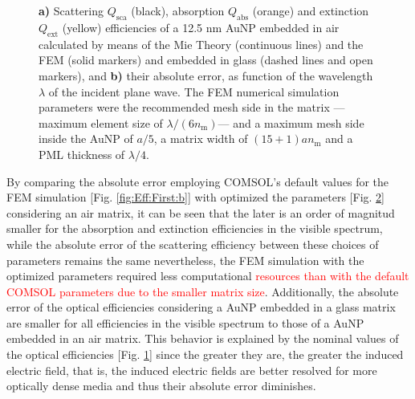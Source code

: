 \begin{figure}[h!]
 \def\svgwidth{.9\textwidth}
 \small
 \centering
    \hspace*{-.95\textwidth}
     \begin{subfigure}{\textwidth}\caption{}\label{fig:Eff:Conv:a}\end{subfigure}\\[11.5em]
    \hspace*{-.95\textwidth}
     \begin{subfigure}{\textwidth}\caption{}\label{fig:Eff:Conv:b}\end{subfigure}\\[-15em]
\caption[Scattering, Absorption and Extinction Efficiencies of a 12.5 nm AuNP$@$Air: Analytical and FEM solutions with optimized parameters for a FEM simulation]{\textbf{a)} Scattering $Q_\text{sca}$ (black), absorption $Q_\text{abs}$ (orange) and extinction $Q_\text{ext}$ (yellow) efficiencies of a 12.5 nm AuNP embedded in air calculated by means of the Mie Theory (continuous lines) and the FEM (solid markers) and embedded in glass (dashed lines and open markers), and \textbf{b)} their absolute error, as function of the wavelength $\lambda$ of the incident plane wave. The FEM numerical simulation parameters were the recommended mesh side in the matrix ---maximum element size of $\lambda/(6n_\text{m})$--- and a maximum mesh side inside the AuNP of $a/5$, a matrix width of $(15+1) a n_\text{m}$ and a PML thickness of $\lambda/4$.}
\label{fig:Eff:Conv}
\end{figure}

By comparing the absolute error employing COMSOL's default values for the FEM simulation [Fig. \ref{fig:Eff:First:b}] with optimized the parameters [Fig. \ref{fig:Eff:Conv:b}] considering an air matrix, it can be seen that the later is an order of magnitud smaller for the absorption and extinction efficiencies in the visible spectrum, while the absolute error of the scattering efficiency between these choices of parameters remains the same nevertheless, the FEM simulation with the optimized parameters required less computational \textcolor{red}{resources than with the default COMSOL parameters due to the smaller matrix size}. Additionally, the absolute error of the optical efficiencies considering a AuNP embedded in a glass matrix are smaller for all efficiencies in the visible spectrum to those of a AuNP embedded in an air matrix. This behavior is explained by the nominal values of the optical efficiencies [Fig. \ref{fig:Eff:Conv:a}] since the greater they are, the greater the induced electric field, that is, the induced electric fields are better resolved for more optically dense media and thus their absolute error diminishes.
